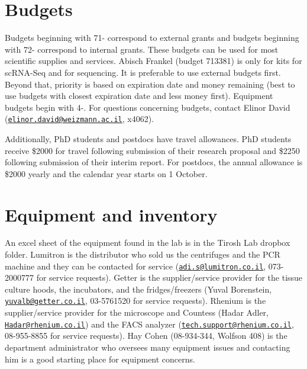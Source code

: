 \documentclass[
]{book}
\begin{document}
\hypertarget{budgets}{%
\chapter{Budgets}\label{budgets}}

Budgets beginning with 71- correspond to external grants and budgets beginning with 72- correspond to internal grants. These budgets can be used for most scientific supplies and services. Abisch Frankel (budget 713381) is only for kits for scRNA-Seq and for sequencing. It is preferable to use external budgets first. Beyond that, priority is based on expiration date and money remaining (best to use budgets with closest expiration date and less money first). Equipment budgets begin with 4-. For questions concerning budgets, contact Elinor David (\href{mailto:elinor.david@weizmann.ac.il}{\nolinkurl{elinor.david@weizmann.ac.il}}, x4062).

Additionally, PhD students and postdocs have travel allowances. PhD students receive \$2000 for travel following submission of their research proposal and \$2250 following submission of their interim report. For postdocs, the annual allowance is \$2000 yearly and the calendar year starts on 1 October.

\hypertarget{equipment}{%
\chapter{Equipment and inventory}\label{equipment}}

An excel sheet of the equipment found in the lab is in the Tirosh Lab dropbox folder. Lumitron is the distributor who sold us the centrifuges and the PCR machine and they can be contacted for service (\href{mailto:adi.s@lumitron.co.il}{\nolinkurl{adi.s@lumitron.co.il}}, 073-2000777 for service requests). Getter is the supplier/service provider for the tissue culture hoods, the incubators, and the fridges/freezers (Yuval Borenstein, \href{mailto:yuvalb@getter.co.il}{\nolinkurl{yuvalb@getter.co.il}}, 03-5761520 for service requests). Rhenium is the supplier/service provider for the microscope and Countess (Hadar Adler, \href{mailto:Hadar@rhenium.co.il}{\nolinkurl{Hadar@rhenium.co.il}}) and the FACS analyzer (\href{mailto:tech.support@rhenium.co.il}{\nolinkurl{tech.support@rhenium.co.il}}, 08-955-8855 for service requests). Hay Cohen (08-934-344, Wolfson 408) is the department administrator who oversees many equipment issues and contacting him is a good starting place for equipment concerns.
\end{document}
